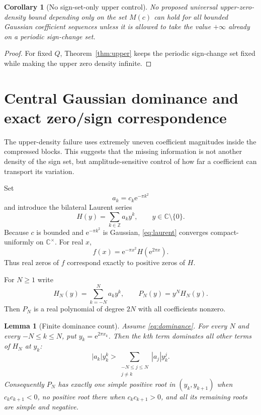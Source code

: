 \documentclass[11pt]{article}
\newtheorem{lemma}[theorem]{Lemma}
\newtheorem{corollary}[theorem]{Corollary}
\newcommand{\Z}{\mathbb{Z}}
\newcommand{\C}{\mathbb{C}}
\newcommand{\e}{\mathrm{e}}
\begin{document}
\begin{corollary}[No sign-set-only upper control]\label{cor:signset-only}
No proposed universal upper-zero-density bound depending only on the set $M(c)$ can hold for all bounded Gaussian coefficient sequences unless it is allowed to take the value $+\infty$ already on a periodic sign-change set.
\end{corollary}

\begin{proof}
For fixed $Q$, Theorem~\ref{thm:upper} keeps the periodic sign-change set fixed while making the upper zero density infinite.
\end{proof}

\section{Central Gaussian dominance and exact zero/sign correspondence}
The upper-density failure uses extremely uneven coefficient magnitudes inside the compressed blocks. This suggests that the missing information is not another density of the sign set, but amplitude-sensitive control of how far a coefficient can transport its variation.

Set
\[
 a_k=c_k\e^{-\pi k^2}
\]
and introduce the bilateral Laurent series
\begin{equation}\label{eq:laurent}
 H(y)=\sum_{k\in\Z}a_ky^k,\qquad y\in\C\setminus\{0\}.
\end{equation}
Because $c$ is bounded and $\e^{-\pi k^2}$ is Gaussian, \eqref{eq:laurent} converges compact-uniformly on $\C^\times$. For real $x$,
\begin{equation}\label{eq:f-H}
 f(x)=\e^{-\pi x^2}H(\e^{2\pi x}).
\end{equation}
Thus real zeros of $f$ correspond exactly to positive zeros of $H$.

For $N\ge1$ write
\[
 H_N(y)=\sum_{k=-N}^{N}a_ky^k,\qquad
 P_N(y)=y^NH_N(y).
\]
Then $P_N$ is a real polynomial of degree $2N$ with all coefficients nonzero.

\begin{lemma}[Finite dominance count]\label{lem:finite-dominance}
Assume \eqref{eq:dominance}. For every $N$ and every $-N\le k\le N$, put $y_k=\e^{2\pi x_k}$. Then the $k$th term dominates all other terms of $H_N$ at $y_k$:
\[
 |a_k|y_k^k>
 \sum_{\substack{-N\le j\le N\\j\neq k}}|a_j|y_k^j.
\]
Consequently $P_N$ has exactly one simple positive root in $(y_k,y_{k+1})$ when $c_kc_{k+1}<0$, no positive root there when $c_kc_{k+1}>0$, and all its remaining roots are simple and negative.
\end{lemma}
\end{document}
